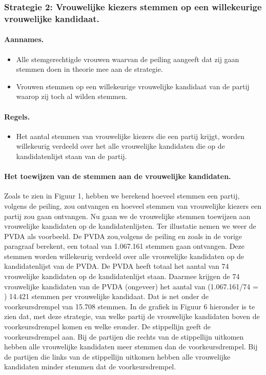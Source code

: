 \subsubsection*{Strategie 2: Vrouwelijke kiezers stemmen op een willekeurige vrouwelijke kandidaat.}

\paragraph{Aannames.}
\begin{itemize}
	\item
Alle stemgerechtigde vrouwen waarvan de peiling aangeeft dat zij gaan stemmen doen in theorie mee aan de strategie.
	\item
Vrouwen stemmen op een willekeurige vrouwelijke kandidaat van de partij waarop zij toch al wilden stemmen.
\end{itemize}

\paragraph{Regels.}
\begin{itemize}
	\item
Het aantal stemmen van vrouwelijke kiezers die een partij krijgt, worden willekeurig verdeeld over het alle vrouwelijke kandidaten die op de kandidatenlijst staan van de partij. 	 	
\end{itemize}

\paragraph{Het toewijzen van de stemmen aan de vrouwelijke kandidaten.}
Zoals te zien in Figuur 1, hebben we berekend hoeveel stemmen een partij, volgens de peiling, zou ontvangen en hoeveel stemmen van vrouwelijke kiezers een partij zou gaan ontvangen. Nu gaan we de vrouwelijke stemmen toewijzen aan vrouwelijke kandidaten op de kandidatenlijsten. Ter illustatie nemen we weer de PVDA als voorbeeld. De PVDA zou,volgens de peiling en zoals in de vorige paragraaf berekent, een totaal van 1.067.161 stemmen gaan ontvangen. Deze stemmen worden willekeurig verdeeld over alle vrouwelijke kandidaten op de kandidatenlijst van de PVDA. De PVDA heeft totaal het aantal van 74 vrouwelijke kandidaten op de kandidatenlijst staan. Daarmee krijgen de 74 vrouwelijke kandidaten van de PVDA (ongeveer) het aantal van (1.067.161/74 = ) 14.421 stemmen per vrouwelijke kandidaat. Dat is net onder de voorkeursdrempel van 15.708 stemmen. In de grafiek in Figuur 6 hieronder is te zien dat, met deze strategie, van welke partij de vrouwelijke kandidaten boven de voorkeursdrempel komen en welke eronder. De stippellijn geeft de voorkeursdrempel aan. Bij de partijen die rechts van de stippellijn uitkomen hebben alle vrouwelijke kandidaten meer stemmen dan de voorkeursdrempel. Bij de partijen die links van de stippellijn uitkomen hebben alle vrouwelijke kandidaten minder stemmen dat de voorkeursdrempel.  

